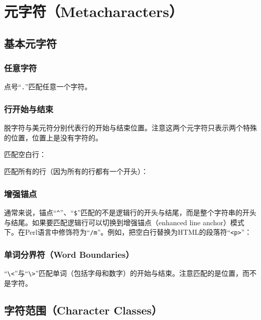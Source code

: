 
\chapter{元字符（Metacharacters）}

\section{基本元字符}

\subsection{任意字符}

点号“\verb|.|”匹配任意一个字符。

\subsection{行开始与结束}

脱字符与美元符分别代表行的开始与结束位置。注意这两个元字符只表示两个特殊的位置，位置上是没有字符的。


匹配空白行：


匹配所有的行（因为所有的行都有一个开头）：


\subsection{增强锚点}

通常来说，锚点“\verb|^|”、“\verb|$|”匹配的不是逻辑行的开头与结尾，而是整个字符串的开头与结尾。如果要匹配逻辑行可以切换到增强锚点（enhanced line anchor）模式下。在Perl语言中修饰符为“\verb|/m|”。例如，把空白行替换为HTML的段落符“\verb|<p>|”：





\subsection{单词分界符（Word Boundaries）}

“\verb|\<|”与“\verb|\>|”匹配单词（包括字母和数字）的开始与结束。注意匹配的是位置，而不是字符。



\section{字符范围（Character Classes）}

